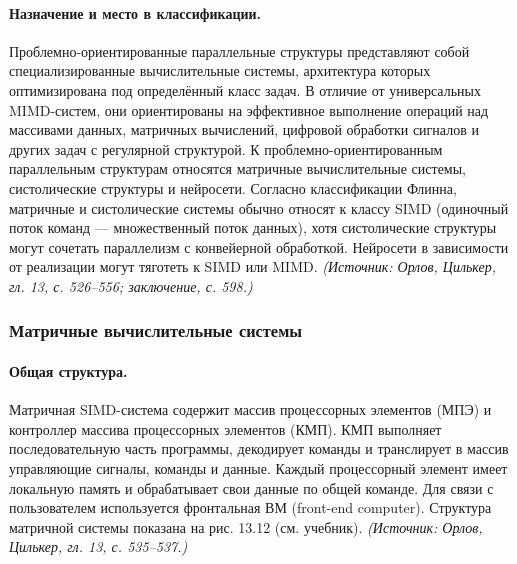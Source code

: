 \documentclass[a4paper,12pt]{article}
\begin{document}
\paragraph{Назначение и место в классификации.}
Проблемно-ориентированные параллельные структуры представляют собой специализированные вычислительные системы, архитектура которых оптимизирована под определённый класс задач. В отличие от универсальных MIMD-систем, они ориентированы на эффективное выполнение операций над массивами данных, матричных вычислений, цифровой обработки сигналов и других задач с регулярной структурой. К проблемно-ориентированным параллельным структурам относятся матричные вычислительные системы, систолические структуры и нейросети. Согласно классификации Флинна, матричные и систолические системы обычно относят к классу SIMD (одиночный поток команд — множественный поток данных), хотя систолические структуры могут сочетать параллелизм с конвейерной обработкой. Нейросети в зависимости от реализации могут тяготеть к SIMD или MIMD.
\textit{(Источник: Орлов, Цилькер, гл. 13, с. 526--556; заключение, с. 598.)}

\subsubsection{Матричные вычислительные системы}

\paragraph{Общая структура.}
Матричная SIMD-система содержит массив процессорных элементов (МПЭ) и контроллер массива процессорных элементов (КМП). КМП выполняет последовательную часть программы, декодирует команды и транслирует в массив управляющие сигналы, команды и данные. Каждый процессорный элемент имеет локальную память и обрабатывает свои данные по общей команде. Для связи с пользователем используется фронтальная ВМ (front-end computer). Структура матричной системы показана на рис. 13.12 (см. учебник).
\textit{(Источник: Орлов, Цилькер, гл. 13, с. 535--537.)}
\end{document}
